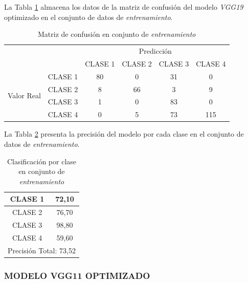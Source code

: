 La Tabla \ref{tab:MC_VGG19_OPT_2} almacena los datos de la matriz de confusión del modelo \textit{VGG19} optimizado en el conjunto de datos de \textit{entrenamiento}.

\begin{table}[htbp]
	\centering	
	\resizebox{10cm}{!} {
	\begin{tabular}{|c|l|c|c|c|c|}
		\hline
		\multicolumn{2}{|c|}{\multirow{2}[4]{*}{}} & \multicolumn{4}{c|}{Predicción} \bigstrut\\
		\cline{3-6}    \multicolumn{2}{|c|}{} & CLASE 1 & CLASE 2 & CLASE 3 & CLASE 4 \bigstrut\\
		\hline
		\multirow{4}[8]{*}{\begin{sideways}Valor Real\end{sideways}} & CLASE 1 & 80    & 0     & 31    & 0 \bigstrut\\
		\cline{2-6}          & CLASE 2 & 8     & 66     & 3    & 9 \bigstrut\\
		\cline{2-6}          & CLASE 3 & 1     & 0     & 83    & 0 \bigstrut\\
		\cline{2-6}          & CLASE 4 & 0     & 5     & 73    & 115 \bigstrut\\
		\hline
	\end{tabular}
	}
	\caption{Matriz de confusión en conjunto de \textit{entrenamiento}}
	\label{tab:MC_VGG19_OPT_2}%
\end{table}%

La Tabla \ref{tab:VGG19optclases_2} presenta la precisión del modelo por cada clase en el conjunto de datos de \textit{entrenamiento}.

\begin{table}[htbp]
	\centering
	\begin{tabular}{|c|c|}
		\hline
		CLASE 1 & 72,10 \bigstrut\\
		\hline
		CLASE 2 & 76,70 \bigstrut\\
		\hline
		CLASE 3 & 98,80 \bigstrut\\
		\hline
		CLASE 4 & 59,60 \bigstrut\\
		\hline
		\multicolumn{2}{|c|}{Precisión Total: 73,52} \bigstrut\\
		\hline
	\end{tabular}%
	\caption{Clasificación por clase en conjunto de \textit{entrenamiento}}
	\label{tab:VGG19optclases_2}%
\end{table}

\subsubsection{\MakeUppercase{Modelo VGG11 optimizado}}

